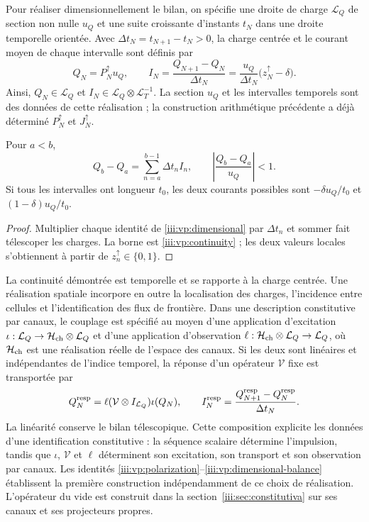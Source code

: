 Pour réaliser dimensionnellement le bilan, on spécifie une droite de charge
$\mathcal L_Q$ de section non nulle $u_Q$ et une suite croissante
d’instants $t_N$ dans une droite temporelle orientée. Avec
$\Delta t_N=t_{N+1}-t_N>0$, la charge centrée et le courant moyen de
chaque intervalle sont définis par
\begin{equation}
 Q_N=P_N^{\uparrow}u_Q,\qquad
 I_N=\frac{Q_{N+1}-Q_N}{\Delta t_N}
     =\frac{u_Q}{\Delta t_N}\bigl(z_N^{\uparrow}-\delta\bigr).
 \label{iii:vp:dimensional}
\end{equation}
Ainsi, $Q_N\in\mathcal L_Q$ et $I_N\in\mathcal L_Q\otimes\mathcal L_T^{-1}$. La section $u_Q$ et les intervalles temporels sont des données de cette réalisation ; la construction arithmétique précédente a déjà déterminé $P_N^{\uparrow}$ et $J_N^{\uparrow}$.

\begin{proposition}
Pour $a<b$,
\begin{equation}
 Q_b-Q_a=\sum_{n=a}^{b-1}\Delta t_n I_n,
 \qquad
 \left|\frac{Q_b-Q_a}{u_Q}\right|<1.
 \label{iii:vp:dimensional-balance}
\end{equation}
Si tous les intervalles ont longueur $t_0$, les deux courants possibles
sont $-\delta u_Q/t_0$ et $(1-\delta)u_Q/t_0$.
\end{proposition}
\begin{proof}
Multiplier chaque identité de \eqref{iii:vp:dimensional} par
$\Delta t_n$ et sommer fait télescoper les charges. La borne est
\eqref{iii:vp:continuity} ; les deux valeurs locales s’obtiennent à partir de
$z_n^{\uparrow}\in\{0,1\}$.
\end{proof}

La continuité démontrée est temporelle et se rapporte à la charge centrée. Une réalisation spatiale incorpore en outre la localisation des charges, l'incidence entre cellules et l'identification des flux de frontière. Dans une description constitutive par canaux, le couplage est spécifié au moyen d'une application d'excitation $\iota:\mathcal L_Q\to\mathcal H_{\rm ch}\otimes\mathcal L_Q$ et d'une application d'observation $\ell:\mathcal H_{\rm ch}\otimes\mathcal L_Q\to\mathcal L_Q$, où $\mathcal H_{\rm ch}$ est une réalisation réelle de l'espace des canaux. Si les deux sont linéaires et indépendantes de l'indice temporel, la réponse d'un opérateur $\mathcal V$ fixe est transportée par
\[
 Q_N^{\rm resp}=\ell(\mathcal V\otimes I_{\mathcal L_Q})\iota(Q_N),
 \qquad
 I_N^{\rm resp}=\frac{Q_{N+1}^{\rm resp}-Q_N^{\rm resp}}{\Delta t_N}.
\]
La linéarité conserve le bilan télescopique. Cette composition
explicite les données d’une identification constitutive : la séquence
scalaire détermine l’impulsion, tandis que $\iota$, $\mathcal V$ et $\ell$
déterminent son excitation, son transport et son observation par canaux. Les
identités \eqref{iii:vp:polarization}--\eqref{iii:vp:dimensional-balance}
établissent la première construction indépendamment de ce choix de
réalisation. L’opérateur du vide est construit dans la
section~\ref{iii:sec:constitutiva} sur ses canaux et ses projecteurs propres.

